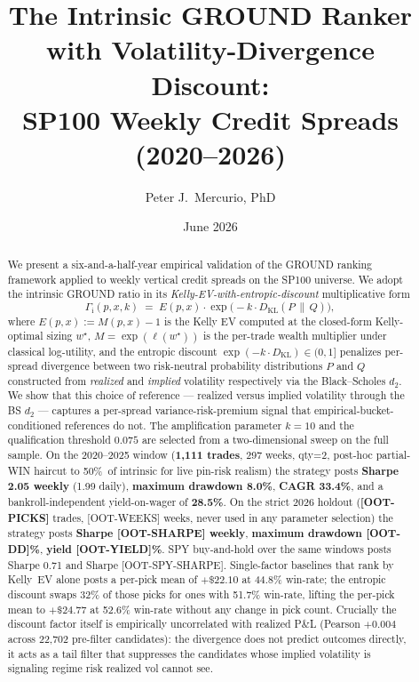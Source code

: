 \documentclass[11pt]{article}
\title{The Intrinsic GROUND Ranker with Volatility-Divergence Discount: \\
       SP100 Weekly Credit Spreads (2020--2026)}
\author{Peter J.~Mercurio, PhD}
\affil{\small \texttt{peter.mercurio@alumni.utoronto.ca}}
\date{June 2026}
\newcommand{\GROUND}{\Gamma_{\mathrm{i}}}
\newcommand{\KL}{D_{\mathrm{KL}}}
\theoremstyle{definition}
\theoremstyle{remark}
\begin{document}
\maketitle

\begin{abstract}
We present a six-and-a-half-year empirical validation of the GROUND ranking
framework applied to weekly vertical credit spreads on the SP100 universe.
We adopt the intrinsic GROUND ratio in its \emph{Kelly-EV-with-entropic-discount}
multiplicative form
\[
\GROUND(p, x, k) \;=\; E(p, x) \cdot \exp\!\bigl(-k \cdot \KL(P \,\|\, Q)\bigr),
\]
where $E(p, x) := M(p, x) - 1$ is the Kelly EV computed at the closed-form
Kelly-optimal sizing $w^\star$, $M = \exp(\ell(w^\star))$ is the per-trade
wealth multiplier under classical log-utility, and the entropic discount
$\exp(-k \cdot \KL) \in (0, 1]$ penalizes per-spread divergence between two
risk-neutral probability distributions $P$ and $Q$ constructed from
\emph{realized} and \emph{implied} volatility respectively via the
Black--Scholes $d_2$. We show that this choice of reference --- realized
versus implied volatility through the BS $d_2$ --- captures a per-spread
variance-risk-premium signal that empirical-bucket-conditioned references
do not. The amplification parameter $k = 10$ and the qualification
threshold $0.075$ are selected from a two-dimensional sweep on the full
sample. On the 2020--2025 window
(\textbf{1{,}111 trades}, 297 weeks, qty=2, post-hoc partial-WIN haircut
to 50\%~of intrinsic for live pin-risk realism) the strategy posts
\textbf{Sharpe 2.05 weekly} (1.99 daily), \textbf{maximum drawdown 8.0\%},
\textbf{CAGR 33.4\%}, and a bankroll-independent yield-on-wager of
\textbf{28.5\%}. On the strict 2026 holdout
(\textbf{[OOT-PICKS]} trades, [OOT-WEEKS] weeks, never used in any
parameter selection) the strategy posts \textbf{Sharpe [OOT-SHARPE]
weekly}, \textbf{maximum drawdown [OOT-DD]\%}, \textbf{yield [OOT-YIELD]\%}.
SPY buy-and-hold over the same windows posts Sharpe 0.71 and Sharpe
[OOT-SPY-SHARPE]. Single-factor baselines that rank by Kelly~EV alone
posts a per-pick mean of $+\$22.10$ at 44.8\% win-rate; the entropic
discount swaps 32\% of those picks for ones with 51.7\% win-rate,
lifting the per-pick mean to $+\$24.77$ at 52.6\% win-rate without any
change in pick count. Crucially the discount factor itself is empirically
uncorrelated with realized P\&L (Pearson $+0.004$ across 22{,}702
pre-filter candidates): the divergence does not predict outcomes
directly, it acts as a tail filter that suppresses the candidates whose
implied volatility is signaling regime risk realized vol cannot see.
\end{abstract}
\end{document}
